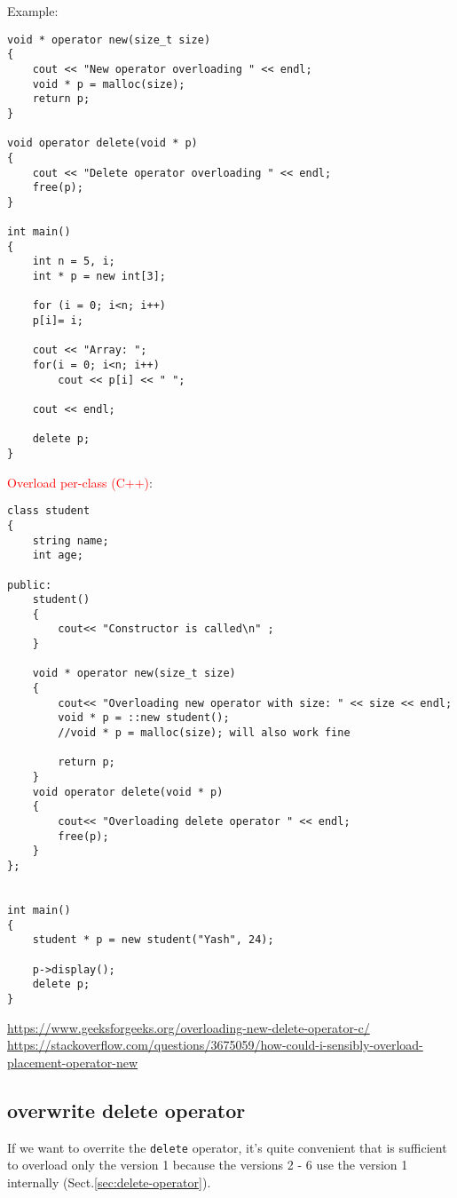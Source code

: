 Example:
\begin{verbatim}
void * operator new(size_t size) 
{ 
    cout << "New operator overloading " << endl; 
    void * p = malloc(size); 
    return p; 
} 

void operator delete(void * p) 
{ 
    cout << "Delete operator overloading " << endl; 
    free(p); 
} 
  
int main() 
{ 
    int n = 5, i; 
    int * p = new int[3]; 
  
    for (i = 0; i<n; i++) 
    p[i]= i; 
  
    cout << "Array: "; 
    for(i = 0; i<n; i++) 
        cout << p[i] << " "; 
          
    cout << endl; 
  
    delete p; 
} 
\end{verbatim}


\textcolor{red}{Overload per-class (C++)}: 
\begin{lstlisting}
class student 
{ 
    string name; 
    int age; 
    
public: 
    student() 
    { 
        cout<< "Constructor is called\n" ;  
    } 
    
    void * operator new(size_t size) 
    { 
        cout<< "Overloading new operator with size: " << size << endl; 
        void * p = ::new student();  
        //void * p = malloc(size); will also work fine 
      
        return p; 
    } 
    void operator delete(void * p) 
    { 
        cout<< "Overloading delete operator " << endl; 
        free(p); 
    }     
};


int main() 
{ 
    student * p = new student("Yash", 24); 
  
    p->display(); 
    delete p; 
} 
\end{lstlisting}
\url{https://www.geeksforgeeks.org/overloading-new-delete-operator-c/}
\url{https://stackoverflow.com/questions/3675059/how-could-i-sensibly-overload-placement-operator-new}


\subsection{overwrite delete operator}
\label{sec:delete()-overwrite-it}

If we want to overrite the \verb!delete! operator, it's quite convenient that is
sufficient to overload only the version 1 because the versions 2 - 6 use the
version 1 internally (Sect.\ref{sec:delete-operator}).

